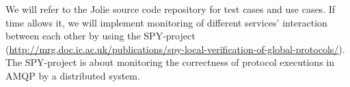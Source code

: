 We will refer to the Jolie source code repository for test cases and use cases. 
If time allows it, we will implement monitoring of different services’ interaction between each other by using the SPY-project (\url{http://mrg.doc.ic.ac.uk/publications/spy-local-verification-of-global-protocols/}). The SPY-project is about monitoring the correctness of protocol executions in AMQP by a distributed system.
\newpage
\begin{comment}
\begin{figure}[H]
  \texttt{[image: illustrations/UseCase\_ver1.png]}
  \caption{Usecase version 1.1}
  \label{dailyscrum}
\end{figure}
\begin{figure}[H]
  \texttt{[image: illustrations/UseCase\_ver2.png]}
  \caption{Usecase version 2.0}
  \label{burndown}
\end{figure}
\end{comment}